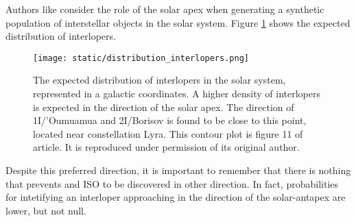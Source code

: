 Authors like \cite{marceta2023} consider the role of the solar apex when
generating a synthetic population of interstellar objects in the solar system.
Figure \ref{fig:distribution_interlopers} shows the expected distribution of
interlopers.

\vspace{1cm}

\begin{figure}[H]
  \centering
  \texttt{[image: static/distribution\_interlopers.png]}
  \caption[Expected interlopers distribution in the solar system.]{The
    expected distribution of interlopers in the solar system, represented in
    a galactic coordinates. A higher density of interlopers is expected in
    the direction of the solar apex. The direction of 1I/'Oumuamua and 2I/Borisov
    is found to be close to this point, located near constellation Lyra.
    This contour plot is figure 11 of \cite{marceta2023} article. It is
    reproduced under permission of its original author.
  }
  \label{fig:distribution_interlopers}
\end{figure}

Despite this preferred direction, it is important to remember that there is
nothing that prevents and ISO to be discovered in other direction. In fact,
probabilities for intetifying an interloper approaching in the direction of the
solar-antapex are lower, but not null.

